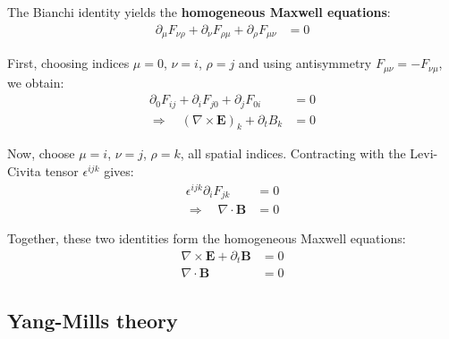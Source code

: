 The Bianchi identity yields the \textbf{homogeneous Maxwell equations}:
\begin{align*}
  \partial_\mu F_{\nu\rho} + \partial_\nu F_{\rho\mu} + \partial_\rho F_{\mu\nu} &= 0
\end{align*}

First, choosing indices \(\mu=0\), \(\nu=i\), \(\rho=j\) and using antisymmetry \(F_{\mu\nu} = -F_{\nu\mu}\), we obtain:
\begin{align*}
  \partial_0 F_{ij} + \partial_i F_{j0} + \partial_j F_{0i} &= 0 \\
  \Rightarrow \quad (\nabla \times \mathbf{E})_k + \partial_t B_k &= 0
\end{align*}

Now, choose \(\mu=i\), \(\nu=j\), \(\rho=k\), all spatial indices. Contracting with the Levi-Civita tensor \(\epsilon^{ijk}\) gives:
\begin{align*}
  \epsilon^{ijk} \partial_i F_{jk} &= 0 \\
  \Rightarrow \quad \nabla \cdot \mathbf{B} &= 0
\end{align*}

Together, these two identities form the homogeneous Maxwell equations:
\begin{align*}
  \nabla \times \mathbf{E} + \partial_t \mathbf{B} &= 0 \\
  \nabla \cdot \mathbf{B} &= 0
\end{align*}



\subsection{Yang-Mills theory}

